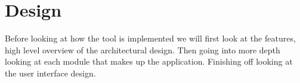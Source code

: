 %
%
%
%
%
%

\section{Design}
\label{sec:design}

Before looking at how the tool is implemented we will first look at the features, high level overview of the architectural design. Then going into more depth looking at each module that makes up the application. Finishing off looking at the user interface design.

